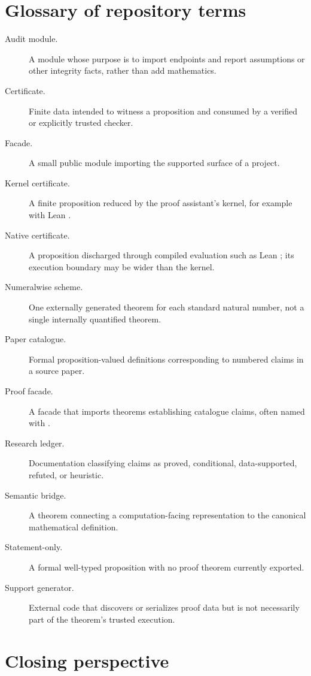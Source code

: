 \documentclass[
  10pt,
  a4paper,
  twoside,
  open=any,
  parskip=half,
  headings=big
]{scrreprt}
\newcommand{\code}[1]{\texttt{\detokenize{#1}}}
\begin{document}
\chapter{Glossary of repository terms}
\label{app:glossary}

\begin{description}
  \item[Audit module.] A module whose purpose is to import endpoints and report assumptions or other integrity facts, rather than add mathematics.
  \item[Certificate.] Finite data intended to witness a proposition and consumed by a verified or explicitly trusted checker.
  \item[Facade.] A small public module importing the supported surface of a project.
  \item[Kernel certificate.] A finite proposition reduced by the proof assistant's kernel, for example with Lean \code{decide}.
  \item[Native certificate.] A proposition discharged through compiled evaluation such as Lean \code{native_decide}; its execution boundary may be wider than the kernel.
  \item[Numeralwise scheme.] One externally generated theorem for each standard natural number, not a single internally quantified theorem.
  \item[Paper catalogue.] Formal proposition-valued definitions corresponding to numbered claims in a source paper.
  \item[Proof facade.] A facade that imports theorems establishing catalogue claims, often named with \code{_holds}.
  \item[Research ledger.] Documentation classifying claims as proved, conditional, data-supported, refuted, or heuristic.
  \item[Semantic bridge.] A theorem connecting a computation-facing representation to the canonical mathematical definition.
  \item[Statement-only.] A formal well-typed proposition with no proof theorem currently exported.
  \item[Support generator.] External code that discovers or serializes proof data but is not necessarily part of the theorem's trusted execution.
\end{description}

\chapter{Closing perspective}
\end{document}
